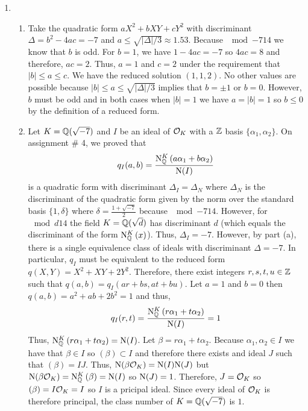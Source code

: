 \documentclass[12pt]{extarticle}
\begin{document}
 
\begin{enumerate}
\item
\begin{enumerate}
\item Take the quadratic form $a X^2 + b XY + c Y^2$ with discriminant $\Delta = b^2 - 4ac = -7$ and $a \le \sqrt{|\Delta| / 3} \approx 1.53$. Because $\mod{-7}{1}{4}$ we know that $b$ is odd. For $b = 1$, we have $1 - 4 ac = -7$ so $4 ac = 8$ and therefore, $ac = 2$. Thus, $a = 1$ and $c = 2$ under the requirement that $|b| \le a \le c$. We have the reduced solution $(1, 1, 2)$. No other values are possible because $|b| \le a \le \sqrt{|\Delta|/3}$ implies that $b = \pm 1$ or $b = 0$. However, $b$ must be odd and in both cases when $|b| = 1$ we have $a = |b| = 1$ so $b \le 0$ by the definition of a reduced form.  

\item Let $K = \mathbb{Q} \small(\sqrt{-7} \small)$ and $I$ be an ideal of $\mathcal{O}_{K}$ with a $\mathbb{Z}$ basis $\{\alpha_1, \alpha_2\}$. On assignment \# 4, we proved that \[q_I(a,b) = \frac{\mathrm{N}^{K}_{\mathbb{Q}}\left(a \alpha_1 + b \alpha_2\right)}{\mathrm{N}(I)}\] is a quadratic form with discriminant $\Delta_I = \Delta_N$ where $\Delta_N$ is the discriminant of the quadratic form given by the norm over the standard basis $\{1, \delta\}$ where $\delta = \frac{1+\sqrt{-7}}{2}$ because $\mod{-7}{1}{4}$. However, for $\mod{d}{1}{4}$ the field $K = \mathbb{Q} \small(\sqrt{d} \small)$ has discriminant $d$ (which equals the discriminant of the form $\mathrm{N}^{K}_{\mathbb{Q}}\left(x\right)$). Thus, $\Delta_I = -7$. However, by part (a), there is a single equivalence class of ideals with discriminant $\Delta = -7$. In particular, $q_I$ must be equivalent to the reduced form $q(X, Y) = X^2 + XY + 2 Y^2$. Therefore, there exist integers  $r,s,t,u \in \mathbb{Z}$ such that $q(a,b) = q_I(ar + bs, at + bu)$. Let $a = 1$ and $b = 0$ then $q(a, b) = a^2 + ab + 2b^2 = 1$ and thus,
\[q_I(r,t) = \frac{\mathrm{N}^{K}_{\mathbb{Q}}\left(r \alpha_1 + t \alpha_2\right)}{\mathrm{N}(I)} = 1\]
Thus, $\mathrm{N}^{K}_{\mathbb{Q}}\left(r \alpha_1 + t \alpha_2\right) = \mathrm{N}(I)$. Let $\beta = r \alpha_1 + t \alpha_2$. Because $\alpha_1, \alpha_2 \in I$ we have that $\beta \in I$ so $(\beta) \subset I$ and therefore there exists and ideal $J$ such that $(\beta) = IJ$. Thus, $\mathrm{N}(\beta \mathcal{O}_{K}) = \mathrm{N}(I) \mathrm{N}(J)$ but $\mathrm{N}(\beta \mathcal{O}_{K}) = \mathrm{N}^{K}_{\mathbb{Q}}\left(\beta\right) = \mathrm{N}(I)$ so $\mathrm{N}(J) = 1$. Therefore, $J = \mathcal{O}_{K}$ so $(\beta) = I \mathcal{O}_{K} = I$ so $I$ is a pricipal ideal. Since every ideal of $\mathcal{O}_{K}$ is therefore principal, the class number of $K = \mathbb{Q} \small(\sqrt{-7} \small)$ is $1$.      


\end{enumerate}
\end{enumerate}
\end{document}
